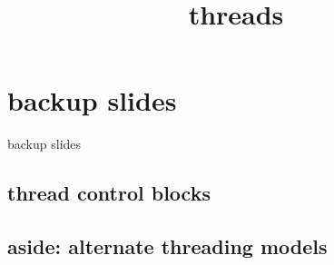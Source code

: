 \graphicspath{{./figures/}}
\title{threads}
\date{}

\begin{frame}
    \titlepage
\end{frame}



\section{backup slides}
\begin{frame}{backup slides}
\end{frame}

\subsection{thread control blocks}


\subsection{aside: alternate threading models}



